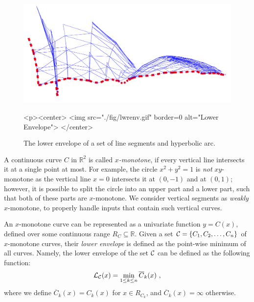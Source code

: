 \begin{figure}[!htp]
\begin{center}
\begin{ccTexOnly}
  \includegraphics[width=5in]{Envelope_2/fig/lwrenv}
\end{ccTexOnly}
\label{fig:teaser}
\begin{ccHtmlOnly}
  <p><center>
    <img src="./fig/lwrenv.gif" border=0 alt="Lower Envelope">
  </center>
\end{ccHtmlOnly}
\caption{The lower envelope of a set of line segments and hyperbolic
arc.} 
\end{center}
\end{figure}


A continuous curve $C$ in ${\mathbb R}^2$ is called {\em $x$-monotone}, if
every vertical line intersects it at a single point at most. For
example, the circle $x^2 + y^2 = 1$ is {\em not} $xy$-monotone as the
vertical line $x = 0$ intersects it at $(0, -1)$ and at $(0, 1)$;
however, it is possible to split the circle into an upper part and a
lower part, such that both of these parts are $x$-monotone.
We consider vertical segments as {\em weakly} $x$-monotone, to properly
handle inputs that contain such vertical curves.

An $x$-monotone curve can be represented as a univariate function
$y = C(x)$, defined over some continuous range $R_C \subseteq {\mathbb R}$.
Given a set ${\cal C} = \{ C_1, C_2, \ldots, C_n \}$ of $x$-monotone
curves, their {\em lower envelope} is defined as the point-wise minimum of
all curves. Namely, the lower envelope of the set ${\cal C}$ can be
defined as the following function:
\begin{eqnarray*}
{\cal L}_{{\cal C}} (x) = \min_{1 \leq k \leq n}{\overline{C}_k (x)} \ ,
\end{eqnarray*}
where we define $\overline{C}_k(x) = C_k(x)$ for $x \in R_{C_k}$,
and $\overline{C}_k(x) = \infty$ otherwise.

